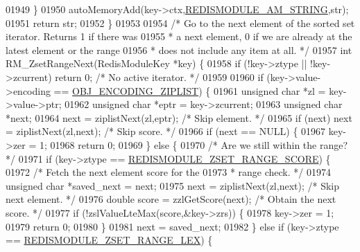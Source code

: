 \begin{DoxyCode}
{{{01949     \}
01950     autoMemoryAdd(key->ctx,\hyperlink{module_8c_a566ace39ef8d3d16c3f7d9d6c6b8e4ef}{REDISMODULE\_AM\_STRING},str);
01951     \textcolor{keywordflow}{return} str;
01952 \}
01953 
01954 \textcolor{comment}{/* Go to the next element of the sorted set iterator. Returns 1 if there was}
01955 \textcolor{comment}{ * a next element, 0 if we are already at the latest element or the range}
01956 \textcolor{comment}{ * does not include any item at all. */}
01957 \textcolor{keywordtype}{int} RM\_ZsetRangeNext(RedisModuleKey *key) \{
01958     \textcolor{keywordflow}{if} (!key->ztype || !key->zcurrent) \textcolor{keywordflow}{return} 0; \textcolor{comment}{/* No active iterator. */}
01959 
01960     \textcolor{keywordflow}{if} (key->value->encoding == \hyperlink{server_8h_aabf064ede983103f1fd0df2086e84eee}{OBJ\_ENCODING\_ZIPLIST}) \{
01961         \textcolor{keywordtype}{unsigned} \textcolor{keywordtype}{char} *zl = key->value->ptr;
01962         \textcolor{keywordtype}{unsigned} \textcolor{keywordtype}{char} *eptr = key->zcurrent;
01963         \textcolor{keywordtype}{unsigned} \textcolor{keywordtype}{char} *next;
01964         next = ziplistNext(zl,eptr); \textcolor{comment}{/* Skip element. */}
01965         \textcolor{keywordflow}{if} (next) next = ziplistNext(zl,next); \textcolor{comment}{/* Skip score. */}
01966         \textcolor{keywordflow}{if} (next == NULL) \{
01967             key->zer = 1;
01968             \textcolor{keywordflow}{return} 0;
01969         \} \textcolor{keywordflow}{else} \{
01970             \textcolor{comment}{/* Are we still within the range? */}
01971             \textcolor{keywordflow}{if} (key->ztype == \hyperlink{module_8c_a103d0f18dc1536298a03324d5ba545be}{REDISMODULE\_ZSET\_RANGE\_SCORE}) \{
01972                 \textcolor{comment}{/* Fetch the next element score for the}
01973 \textcolor{comment}{                 * range check. */}
01974                 \textcolor{keywordtype}{unsigned} \textcolor{keywordtype}{char} *saved\_next = next;
01975                 next = ziplistNext(zl,next); \textcolor{comment}{/* Skip next element. */}
01976                 \textcolor{keywordtype}{double} score = zzlGetScore(next); \textcolor{comment}{/* Obtain the next score. */}
01977                 \textcolor{keywordflow}{if} (!zslValueLteMax(score,&key->zrs)) \{
01978                     key->zer = 1;
01979                     \textcolor{keywordflow}{return} 0;
01980                 \}
01981                 next = saved\_next;
01982             \} \textcolor{keywordflow}{else} \textcolor{keywordflow}{if} (key->ztype == \hyperlink{module_8c_a36d7bac3b2781ba9b076ee6feee141a1}{REDISMODULE\_ZSET\_RANGE\_LEX}) \{
}}}
\end{DoxyCode}
